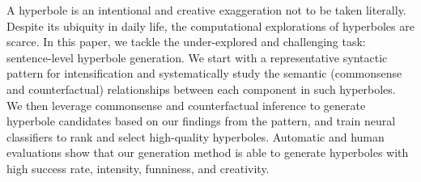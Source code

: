 A hyperbole is an intentional and creative exaggeration not to be taken literally. Despite its ubiquity in daily life, the computational explorations of hyperboles are scarce. In this paper, we tackle the under-explored and challenging task: sentence-level hyperbole generation. We start with a representative syntactic pattern for intensification and systematically study the semantic (commonsense and counterfactual) relationships between each component in such hyperboles. We then leverage commonsense and counterfactual inference to generate hyperbole candidates based on our findings from the pattern, and train neural classifiers to rank and select high-quality hyperboles. Automatic and human evaluations show that our generation method is able to generate hyperboles with high success rate, intensity, funniness, and creativity.
